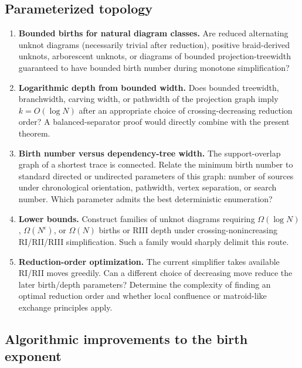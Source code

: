 \subsection{Parameterized topology}

\begin{enumerate}[label=\textbf{Q\arabic*.},resume]
\item \textbf{Bounded births for natural diagram classes.}
      Are reduced alternating unknot diagrams (necessarily trivial after
      reduction), positive braid-derived unknots, arborescent unknots, or
      diagrams of bounded projection-treewidth guaranteed to have bounded birth
      number during monotone simplification?

\item \textbf{Logarithmic depth from bounded width.}
      Does bounded treewidth, branchwidth, carving width, or pathwidth of the
      projection graph imply $k=O(\log N)$ after an appropriate choice of
      crossing-decreasing reduction order?  A balanced-separator proof would
      directly combine with the present theorem.

\item \textbf{Birth number versus dependency-tree width.}
      The support-overlap graph of a shortest trace is connected.  Relate the
      minimum birth number to standard directed or undirected parameters of this
      graph: number of sources under chronological orientation, pathwidth,
      vertex separation, or search number.  Which parameter admits the best
      deterministic enumeration?

\item \textbf{Lower bounds.}
      Construct families of unknot diagrams requiring
      $\Omega(\log N)$, $\Omega(N^\epsilon)$, or $\Omega(N)$ births or RIII
      depth under crossing-nonincreasing RI/RII/RIII simplification.  Such a
      family would sharply delimit this route.

\item \textbf{Reduction-order optimization.}
      The current simplifier takes available RI/RII moves greedily.  Can a
      different choice of decreasing move reduce the later birth/depth
      parameters?  Determine the complexity of finding an optimal reduction
      order and whether local confluence or matroid-like exchange principles
      apply.
\end{enumerate}

\subsection{Algorithmic improvements to the birth exponent}

